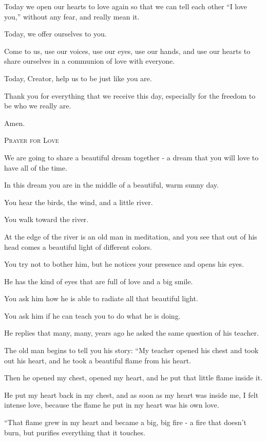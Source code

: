 \documentclass{article}
\numberwithin{equation}{section}
\begin{document}
Today we open our hearts to love again so that we can tell each other ``I love you,'' without any fear, and really mean it.

Today, we offer ourselves to you.

Come to us, use our voices, use our eyes, use our hands, and use our hearts to share ourselves in a communion of love with everyone.

Today, Creator, help us to be just like you are.

Thank you for everything that we receive this day, especially for the freedom to be who we really are.

Amen.
\begin{center}
    \textsc{Prayer for Love}
\end{center}

We are going to share a beautiful dream together - a dream that you will love to have all of the time.

In this dream you are in the middle of a beautiful, warm sunny day.

You hear the birds, the wind, and a little river.

You walk toward the river.

At the edge of the river is an old man in meditation, and you see that out of his head comes a beautiful light of different colors.

You try not to bother him, but he notices your presence and opens his eyes.

He has the kind of eyes that are full of love and a big smile.

You ask him how he is able to radiate all that beautiful light.

You ask him if he can teach you to do what he is doing.

He replies that many, many, years ago he asked the same question of his teacher.

%
The old man begins to tell you his story: ``My teacher opened his chest and took out his heart, and he took a beautiful flame from his heart.

Then he opened my chest, opened my heart, and he put that little flame inside it.

He put my heart back in my chest, and as soon as my heart was inside me, I felt intense love, because the flame he put in my heart was his own love.

%
``That flame grew in my heart and became a big, big fire - a fire that doesn't burn, but purifies everything that it touches.
\end{document}
